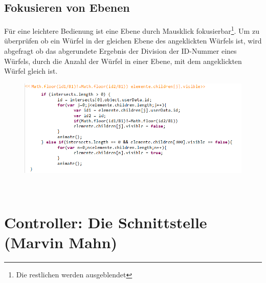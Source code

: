\documentclass[a4paper,12pt]{scrreprt}
\begin{document}
	\subsection{Fokusieren von Ebenen}
	F\"ur eine leichtere Bedienung ist eine Ebene durch Mausklick fokusierbar\footnote{Die restlichen werden ausgeblendet}.
	Um zu \"uberprüfen ob ein W\"urfel in der gleichen Ebene des angeklickten W\"urfels ist, wird abgefragt ob das abgerundete
	Ergebnis der Division der ID-Nummer eines W\"urfels, durch die Anzahl der W\"urfel in einer Ebene, mit dem angeklickten W\"urfel gleich ist.
	\begin{figure}[h]
		\includegraphics[scale=0.7]{pictures/focusLayer_sourcecode}
	\end{figure} \medskip \\
	
	\section{Controller: Die Schnittstelle (Marvin Mahn)}
\end{document}
